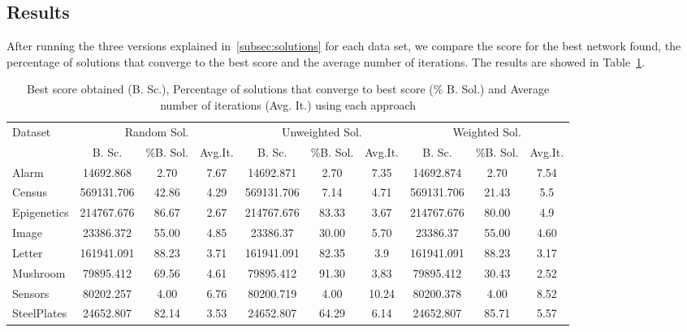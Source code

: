 \subsection{Results}
\label{subsec:results}
	After running the three versions explained in~\ref{subsec:solutions} for each data set, we compare the score for the best network found, the percentage of solutions that converge to the best score and the average number of iterations. The results are showed in Table~\ref{tab:comparison}.
	
	\begin{table}[ h ]
		\centering
		\begin{tabular}{ | l | c | c | c | c | c | c | c | c | c | }
			\hline
			Dataset & \multicolumn{3}{|c|}{Random Sol.} & \multicolumn{3}{|c|}{Unweighted Sol.} & \multicolumn{3}{|c|}{Weighted Sol.} \\ \cline{2-10}
			& B. Sc. & \%B. Sol. & Avg.It. & B. Sc. & \%B. Sol. & Avg.It. & B. Sc. & \%B. Sol. & Avg.It. \\ \hline
			Alarm & 14692.868 & 2.70 & 7.67 & 14692.871 & 2.70 & 7.35 & 14692.874 & 2.70 & 7.54 \\ \hline
			Census & 569131.706 & 42.86 & 4.29 & 569131.706 & 7.14 & 4.71 & 569131.706 & 21.43 & 5.5 \\ \hline
			Epigenetics & 214767.676 & 86.67 & 2.67 & 214767.676 & 83.33 & 3.67 & 214767.676 & 80.00 & 4.9 \\ \hline
			Image & 23386.372 & 55.00 & 4.85 & 23386.37 & 30.00 & 5.70 & 23386.37 & 55.00 & 4.60 \\ \hline
			Letter & 161941.091 & 88.23 & 3.71 & 161941.091 & 82.35 & 3.9 & 161941.091 & 88.23 & 3.17 \\ \hline
			Mushroom & 79895.412 & 69.56 & 4.61 & 79895.412 & 91.30 & 3.83 & 79895.412 & 30.43 & 2.52 \\ \hline
			Sensors & 80202.257 & 4.00 & 6.76 & 80200.719 & 4.00 & 10.24 & 80200.378 & 4.00 & 8.52 \\ \hline
			SteelPlates & 24652.807 & 82.14 & 3.53 & 24652.807 & 64.29 & 6.14 & 24652.807 & 85.71 & 5.57 \\ \hline
		\end{tabular}
		\caption{Best score obtained (B. Sc.), Percentage of solutions that converge to best score (\% B. Sol.) and Average number of iterations (Avg. It.) using each approach}
		\label{tab:comparison}
	\end{table}
	
